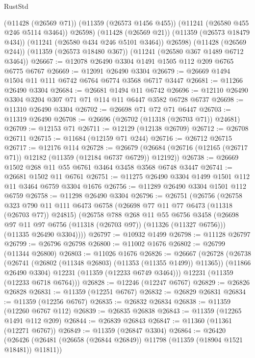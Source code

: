 \begin{lexlean}{RustStd}
\begin{coremodule}
{{{{{{{{{{{{{{{{{{{        (@11428 (@26569 @71))
        (@11359 (@26573 @1456 @455))
        (@11241 (@26580 @455 @246 @5114 @3464))
        @26598)
      (@11428 (@26569 @21))
      (@11359 (@26573 @18479 @434))
      (@11241 (@26580 @434 @246 @5101 @3464))
      @26598)
    (@11428 (@26569 @244))
    (@11359 (@26573 @18480 @367))
    (@11241 (@26580 @367 @1489 @6712 @3464))
@26667 := @12078 @26490 @3304 @1491 @1505 @112 @209 @6765 @6775 @6767
@26669 := @12091 @26490 @3304
@26679 := @26669 @1494 @1504 @11 @111 @6742 @6764 @6774 @3568 @6717 @3447
@26681 := @11266 @26490 @3304
@26684 := @26681 @1494 @11 @6742
@26696 := @12110 @26490 @3304 @3204 @307 @71 @71 @114 @11 @6447 @3582 @6728 @6737
@26698 := @11310 @26490 @3304
@26702 := @26698 @71 @72 @71 @6447
@26703 := @11319 @26490
@26708 := @26696 (@26702 (@11318 (@26703 @71)) @24681)
@26709 := @12153 @71
@26711 := @12129 (@12138 @26709)
@26712 := @26708 @26711
@26715 := @11684 (@12159 @71 @244)
@26716 := @26712 @26715
@26717 := @12176 @114
@26728 := @26679 (@26684 (@26716 (@12165 (@26717 @71)) @12182 (@11359 (@12184 @6737 @6729)) @12192))
@26738 := @26669 @1502 @268 @11 @55 @6761 @3464 @3458 @3568 @6748 @3447
@26741 := @26681 @1502 @11 @6761
@26751 := @11275 @26490 @3304 @1499 @1501 @112 @11 @3464 @6759 @3304 @1676
@26756 := @11289 @26490 @3304 @1501 @112 @6759
@26758 := @11298 @26490 @3304
@26796 := @26751
    (@26756
      (@26758
        @323
        @790
        @11
        @111
        @6473
        @6758
        (@26698 @77 @11 @77 @6473 (@11318 (@26703 @77)) @24815)
        (@26758
          @788
          @268
          @11
          @55
          @6756
          @3458
          (@26698 @97 @11 @97 @6756 (@11318 (@26703 @97)) (@11326 (@11327 @6756)))
          (@11335 @26490 @3304))))
@26797 := @10932 @1499
@26798 := @11128 @26797
@26799 := @26796 @26798
@26800 := @11002 @1676
@26802 := @26799 (@11344 @26800)
@26803 := @11026 @1676
@26826 := @26667
    (@26728
      (@26738
        (@26741 (@26802 (@11348 @26803) (@11353 (@11355 @1499)) @11365))
        (@11866 @26490 @3304)
        @12231
        (@11359 (@12233 @6749 @3464)))
      @12231
      (@11359 (@12233 @6718 @6764)))
@26828 := @12246 (@12247 @6767)
@26829 := @26826 @26828
@26831 := @11359 (@12251 @6767)
@26832 := @26829 @26831
@26834 := @11359 (@12256 @6767)
@26835 := @26832 @26834
@26838 := @11359 (@12260 @6767 @112)
@26839 := @26835 @26838
@26843 := @11359 (@12265 @1491 @112 @209)
@26844 := @26839 @26843
@26847 := @11360 (@11361 (@12271 @6767))
@26849 := @11359 (@26847 @3304)
@26864 := @26420
    (@26426 (@26481 (@26658 (@26844 @26849)) @11798 (@11359 (@18904 @1521 @18481)) @11811))
}}}}}}}}}}}}}}}}}}}
\end{coremodule}
\end{lexlean}
